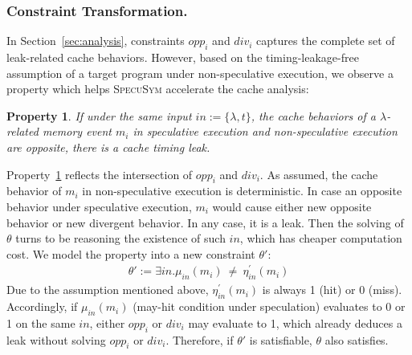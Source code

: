 \documentclass[sigconf]{acmart}
\newcommand{\SpecuSym}{\textsc{SpecuSym} }
\newtheorem{pro}{Property}
\begin{document}
\subsubsection{Constraint Transformation.}
In Section~\ref{sec:analysis}, constraints $\mathit{opp_i}$ and $\mathit{div_i}$
captures the complete set of leak-related cache behaviors. However, based on the
timing-leakage-free assumption of a target program under non-speculative execution,
we observe a property which helps \SpecuSym accelerate the cache analysis:
%
\begin{pro}
  \label{pro:p2}
  If under the same input $\mathit{in:=\{\lambda,t\}}$, the cache behaviors of a 
	$\lambda$-related	memory event $\mathit{m_i}$ in speculative execution and 
	non-speculative execution are opposite, there is a cache timing leak. 
\end{pro}
%
Property~\ref{pro:p2} reflects the intersection of $\mathit{opp_i}$ and 
$\mathit{div_i}$. As assumed, the cache behavior of $\mathit{m_i}$ in 
non-speculative execution is deterministic. In case an opposite behavior 
under speculative execution, $\mathit{m_i}$ would cause either new opposite 
behavior or new divergent behavior. In any case, it is a leak. Then the 
solving of $\theta$ turns to be reasoning the existence of such $\mathit{in}$, 
which has cheaper computation cost. We model the property into a new constraint 
$\theta'$:  
%
\begin{multline}
  \label{eqn:leak}
  ~~~~~~~~~~~~~~~
  \theta':=
  \exists\mathit{in}.
  \mathit{
    \mu_{in}(m_i)~\neq~\eta_{in}^\prime(m_i)
  }
  ~~~~~~~~~~~~~~~
\end{multline}
%
Due to the assumption mentioned above, $\mathit{\eta_{in}^\prime(m_i)}$ 
is always 1 (hit) or 0 (miss). Accordingly, if $\mathit{\mu_{in}(m_i)}$
(may-hit condition under speculation) evaluates to 0 or 1 on the same 
$\mathit{in}$, either $\mathit{opp_i}$ or $\mathit{div_i}$ may evaluate 
to 1, which already deduces a leak without solving $\mathit{opp_i}$ or 
$\mathit{div_i}$. Therefore, if $\theta'$ is satisfiable, $\theta$ also 
satisfies. 
\end{document}
